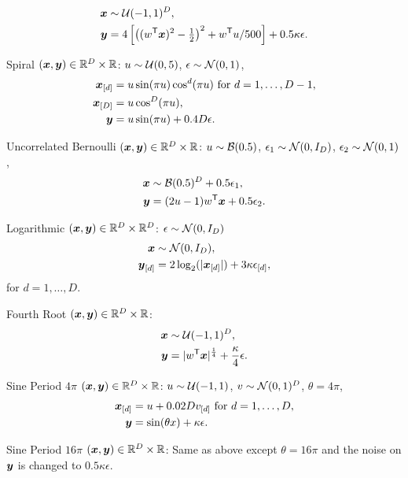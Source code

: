 \documentclass[11pt]{extarticle}
\begin{document}
\begin{compactenum}
\begin{align*}
\boldsymbol{x} &\sim \mathcal{U}(-1,1)^{D},\\
\boldsymbol{y}&=4\left[ \left( (w^{\mathsf{T}} \boldsymbol{x})^2 - \tfrac{1}{2} \right)^2 + w^{\mathsf{T}} u/500 \right]+0.5\kappa\epsilon.
\end{align*}
\item Spiral $(\boldsymbol{x},\boldsymbol{y}) \in \mathbb{R}^{D} \times \mathbb{R}$: $u \sim \mathcal{U}(0,5)$, $\epsilon \sim \mathcal{N}(0, 1)$,
\begin{align*}
\boldsymbol{x}_{[d]}&=u \sin(\pi u)  \cos^{d}(\pi u) \mbox{ for $d=1,\ldots,D-1$},\\
\boldsymbol{x}_{[D]}&=u \cos^{D}(\pi u),\\
\boldsymbol{y}&= u \sin(\pi u) +0.4 D\epsilon.
\end{align*}
\item Uncorrelated Bernoulli $(\boldsymbol{x},\boldsymbol{y}) \in \mathbb{R}^{D} \times \mathbb{R}$: $u \sim \mathcal{B}(0.5)$, $\epsilon_{1} \sim \mathcal{N}(0, I_{D})$, $\epsilon_{2} \sim \mathcal{N}(0, 1)$,
\begin{align*}
\boldsymbol{x} &\sim \mathcal{B}(0.5)^{D}+0.5\epsilon_{1},\\
\boldsymbol{y}&=(2u-1)w^{\mathsf{T}} \boldsymbol{x}+0.5\epsilon_{2}.
\end{align*}
\item Logarithmic $(\boldsymbol{x},\boldsymbol{y}) \in \mathbb{R}^{D} \times \mathbb{R}^{D}$: $\epsilon \sim \mathcal{N}(0, I_{D})$
\begin{align*}
\boldsymbol{x} &\sim \mathcal{N}(0, I_{D}),\\
\boldsymbol{y}_{[d]}&=2\log_{2}(|\boldsymbol{x}_{[d]}|)+3\kappa\epsilon_{[d]},
\end{align*}
for $d=1,\ldots,D$.
\item Fourth Root $(\boldsymbol{x},\boldsymbol{y}) \in \mathbb{R}^{D} \times \mathbb{R}$:
\begin{align*}
\boldsymbol{x} &\sim \mathcal{U}(-1,1)^{D},\\
\boldsymbol{y}&=|w^{\mathsf{T}} \boldsymbol{x}|^\frac{1}{4}+\frac{\kappa}{4}\epsilon.
\end{align*}
\item Sine Period $4\pi$ $(\boldsymbol{x},\boldsymbol{y}) \in \mathbb{R}^{D} \times \mathbb{R}$: $u \sim \mathcal{U}(-1,1)$, $v \sim \mathcal{N}(0,1)^{D}$, $\theta=4\pi$,
\begin{align*}
\boldsymbol{x}_{[d]}&=u+0.02 D v_{[d]} \mbox{ for $d=1,\ldots,D$}, \\
\boldsymbol{y}&=\sin ( \theta x )+\kappa\epsilon.
\end{align*}
\item Sine Period $16\pi$ $(\boldsymbol{x},\boldsymbol{y}) \in \mathbb{R}^{D} \times \mathbb{R}$: Same as above except $\theta=16\pi$ and the noise on $\boldsymbol{y}$ is changed to $0.5\kappa\epsilon$.

\end{compactenum}
\end{document}
